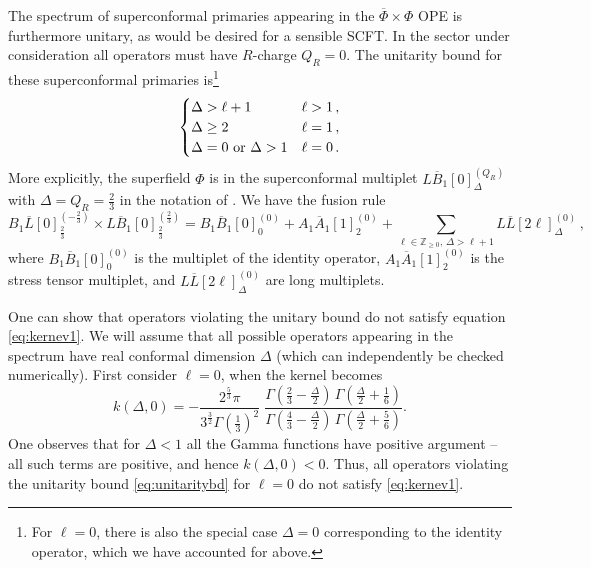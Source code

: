 \documentclass[11pt]{article}
\newcommand{\Phib}{\overline{\Phi}}
\begin{document}
The spectrum of superconformal primaries appearing in the $\Phib \times \Phi$ OPE is furthermore unitary, as would be desired for a sensible SCFT.  In the sector under consideration all operators must have $R$-charge $Q_{R}=0$. The unitarity bound for these superconformal primaries \cite{Minwalla:1997ka,Cordova:2016emh} is\footnote{ For $\ell=0$, there is also the special case $\Delta=0$ corresponding to the identity operator, which we have accounted for above.} 
%
\begin{equation}\label{eq:unitaritybd}
\begin{cases}\Delta >\ell+ 1 & \ell>1\,, \\ \Delta \geq 2 & \ell=1\,, \\ \Delta =0~{\rm or} ~\Delta >1 & \ell=0 \,.
\end{cases}
\end{equation}	
%
More explicitly, the superfield $\Phi$ is in the superconformal multiplet $L\overline B_1[0]^{(Q_{R})}_{\Delta}$ with $\Delta=Q_{R}=\frac{2}{3}$ in the notation of \cite{Cordova:2016emh}. We have the fusion rule
\begin{equation}
B_1\overline L[0]^{(-\frac{2}{3})}_{\frac{2}{3}}\times L\overline B_1[0]^{(\frac{2}{3})}_{\frac{2}{3}} = B_1\overline B_1[0]^{(0)}_0+ A_1\overline A_1[1]_{2}^{(0)} + \sum_{\ell\in{\mathbb Z}_{\ge0},\,\Delta> \ell+1 }L\overline L[2\ell]^{(0)}_{\Delta}\,,
\end{equation}
where $B_1\overline B_1[0]^{(0)}_0$ is the multiplet of the identity operator, $A_1\overline A_1[1]_{2}^{(0)}$ is the stress tensor multiplet, and $L\overline L[2\ell]^{(0)}_{\Delta}$ are long multiplets.


One can show that operators violating the unitary bound do not satisfy equation \eqref{eq:kernev1}. We will assume that all possible operators appearing in the spectrum have real conformal dimension $\Delta$ (which can independently be checked numerically). First consider $\ell=0$, when the kernel becomes
%
\begin{equation}\label{eq:kernl0}
k(\Delta,0) = 
	-\frac{2^{\frac{5}{3}}\pi}{3^{\frac{3}{2}}\Gamma(\frac{1}{3})^2} \; \frac{\Gamma(\frac{2}{3}-\frac{\Delta}{2}) \, \Gamma(\frac{\Delta}{2} +\frac{1}{6})}{\Gamma(\frac{4}{3}-\frac{\Delta}{2})\, \Gamma(\frac{\Delta}{2} + \frac{5}{6})}.
\end{equation}	
%
One observes that for $\Delta < 1$ all the Gamma functions have positive argument -- all such terms are positive, and hence $k(\Delta,0) < 0$. Thus, all operators violating the unitarity bound \eqref{eq:unitaritybd} for $\ell=0$ do not satisfy \eqref{eq:kernev1}.
\end{document}
